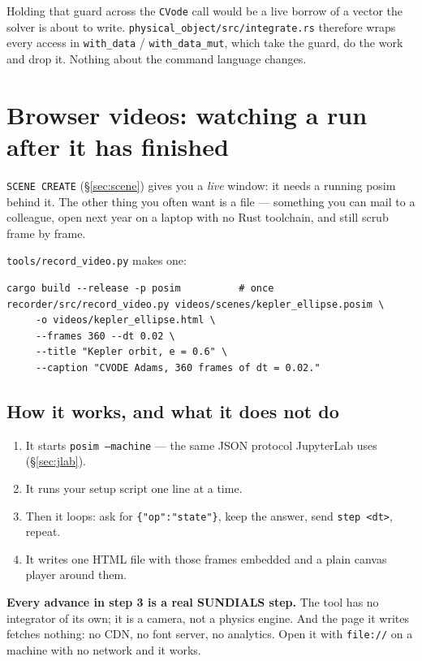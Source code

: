 \documentclass[11pt]{article}
\newcommand{\kw}[1]{\texttt{\uppercase{#1}}}
\newcommand{\code}[1]{\texttt{#1}}
\begin{document}
Holding that guard across the \code{CVode} call would be a live borrow
of a vector the solver is about to write.
\code{physical\_object/src/integrate.rs} therefore wraps every access in
\code{with\_data} / \code{with\_data\_mut}, which take the guard, do the
work and drop it. Nothing about the command language changes.

\section{Browser videos: watching a run after it has finished}

\kw{scene create} (\S\ref{sec:scene}) gives you a \emph{live} window: it
needs a running posim behind it. The other thing you often want is a
file --- something you can mail to a colleague, open next year on a
laptop with no Rust toolchain, and still scrub frame by frame.

\code{tools/record\_video.py} makes one:

\begin{lstlisting}
cargo build --release -p posim          # once
recorder/src/record_video.py videos/scenes/kepler_ellipse.posim \
     -o videos/kepler_ellipse.html \
     --frames 360 --dt 0.02 \
     --title "Kepler orbit, e = 0.6" \
     --caption "CVODE Adams, 360 frames of dt = 0.02."
\end{lstlisting}

\subsection{How it works, and what it does not do}

\begin{enumerate}
\item It starts \code{posim --machine} --- the same JSON protocol
      JupyterLab uses (\S\ref{sec:jlab}).
\item It runs your setup script one line at a time.
\item Then it loops: ask for \code{\{"op":"state"\}}, keep the answer,
      send \code{step <dt>}, repeat.
\item It writes one HTML file with those frames embedded and a plain
      canvas player around them.
\end{enumerate}

\textbf{Every advance in step 3 is a real SUNDIALS step.} The tool has
no integrator of its own; it is a camera, not a physics engine. And the
page it writes fetches nothing: no CDN, no font server, no analytics.
Open it with \code{file://} on a machine with no network and it works.
\end{document}
